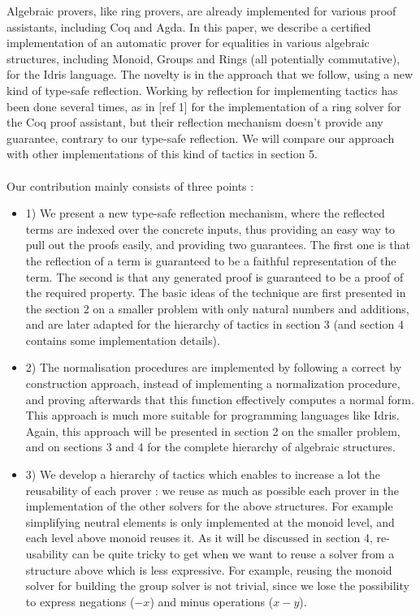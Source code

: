 Algebraic provers, like ring provers, are already implemented for various proof assistants, including Coq and Agda. In this paper, we describe a certified implementation of an automatic prover for equalities in various algebraic structures, including Monoid, Groups and Rings (all potentially commutative), for the Idris language. The novelty is in the approach that we follow, using a new kind of type-safe reflection.
Working by reflection for implementing tactics has been done several times, as in [ref 1] for the implementation of a ring solver for the Coq proof assistant, but their reflection mechanism  doesn't provide any guarantee, contrary to our type-safe reflection. We will compare our approach with other implementations of this kind of tactics in section 5. \\
\\
Our contribution mainly consists of three points :
\begin{itemize}
	\item 1) We present a new type-safe reflection mechanism, where the reflected terms are indexed over the concrete inputs, thus providing an easy way to pull out the proofs easily, and providing two guarantees. The first one is that the reflection of a term is guaranteed to be a faithful representation of the term. The second is that any generated proof is guaranteed to be a proof of the required property. The basic ideas of the technique are first presented in the section 2 on a smaller problem with only natural numbers and additions, and are later adapted for the hierarchy of tactics in section 3 (and section 4 contains some implementation details).	
	\item 2) The normalisation procedures are implemented by following a correct by construction approach, instead of implementing a normalization procedure, and proving afterwards that this function effectively computes a normal form. This approach is much more suitable for programming languages like Idris. Again, this approach will be presented in section 2 on the smaller problem, and on sections 3 and 4 for the complete hierarchy of algebraic structures.
	\item 3) We develop a hierarchy of tactics which enables to increase a lot the reusability of each prover : we reuse as much as possible each prover in the implementation of the other solvers for the above structures. For example simplifying neutral elements is only implemented at the monoid level, and each level above monoid reuses it. As it will be discussed in section 4, re-usability can be quite tricky to get when we want to reuse a solver from a structure above which is less expressive. For example, reusing the monoid solver for building the group solver is not trivial, since we lose the possibility to express negations ($-x$) and minus operations ($x-y$).
\end{itemize}